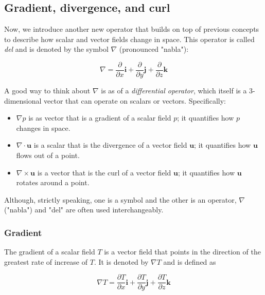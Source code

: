 \documentclass[12pt]{article}
\numberwithin{equation}{section}
\numberwithin{figure}{section}
\numberwithin{table}{section}
\begin{document}
\subsection{Gradient, divergence, and curl}

Now, we introduce another new operator that builds on top of previous
concepts to describe how scalar and vector fields change in space.
This operator is called \textit{del} and is denoted by the symbol
$\nabla$ (pronounced "nabla"):

\begin{equation}
  \label{eq:nabla}
  \nabla = \frac{\partial}{\partial x} \mathbf{i} +
    \frac{\partial}{\partial y} \mathbf{j} +
    \frac{\partial}{\partial z} \mathbf{k}
\end{equation}

A good way to think about $\nabla$ is as of a \textit{differential operator},
which itself is a 3-dimensional vector that can operate on scalars or vectors.
Specifically:

\begin{itemize}
  \item $\nabla p$ is as vector that is a gradient of a scalar field $p$;
  it quantifies how $p$ changes in space.
  \item $\nabla \cdot \mathbf{u}$ is a scalar that is the divergence of a vector
  field $\mathbf{u}$; it quantifies how $\mathbf{u}$ flows out of a point.
  \item $\nabla \times \mathbf{u}$ is a vector that is the curl of a vector field
  $\mathbf{u}$; it quantifies how $\mathbf{u}$ rotates around a point.
\end{itemize}

Although, strictly speaking, one is a symbol and the other is an operator,
$\nabla$ ("nabla") and "del" are often used interchangeably.

\subsubsection{Gradient}

The gradient of a scalar field $T$ is a vector field that points in the
direction of the greatest rate of increase of $T$.
It is denoted by $\nabla T$ and is defined as

\begin{equation}
  \nabla T = \frac{\partial T}{\partial x} \mathbf{i} +
    \frac{\partial T}{\partial y} \mathbf{j} +
    \frac{\partial T}{\partial z} \mathbf{k}
\end{equation}
\end{document}
